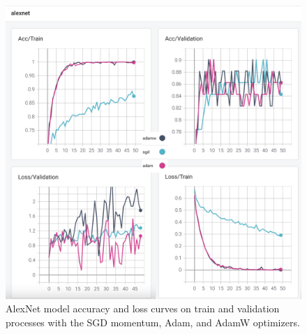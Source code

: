 
\begin{figure}[!h]
	\centering
	\includegraphics[width=\linewidth]{fig/alexnet.png}
	\vspace{2mm}
	\caption{AlexNet model accuracy and loss curves on train and validation processes with the SGD momentum, Adam, and AdamW optimizers.}
	\label{fig:alexnet_plots}
\end{figure}

